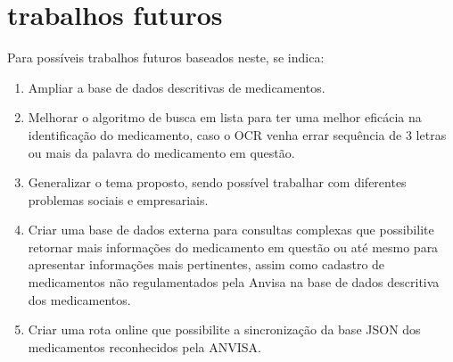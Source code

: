 \section{trabalhos futuros}


Para possíveis trabalhos futuros baseados neste, se indica:

\begin{enumerate}
\item Ampliar a base de dados descritivas de medicamentos.

  \item Melhorar o algoritmo de busca em lista para ter uma melhor eficácia na identificação do medicamento, caso o OCR venha errar sequência de 3 letras ou mais da palavra do medicamento em questão.
  \item Generalizar o tema proposto, sendo possível trabalhar com diferentes problemas sociais e empresariais.
  \item Criar uma base de dados externa para consultas complexas que possibilite retornar mais informações do medicamento em questão ou até mesmo para apresentar informações mais pertinentes, assim como cadastro de medicamentos não regulamentados pela Anvisa na base de dados descritiva dos medicamentos.
  \item Criar uma rota online que possibilite a sincronização da base JSON dos medicamentos reconhecidos pela ANVISA.
\end{enumerate}


